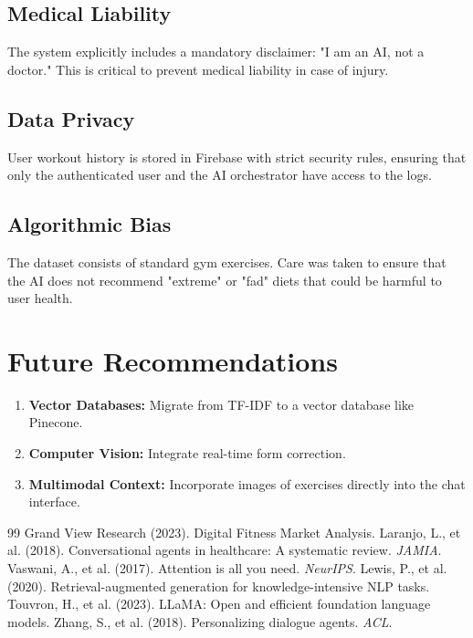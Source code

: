 \documentclass[12pt,a4paper]{report}
\begin{document}
\subsection{Medical Liability}
The system explicitly includes a mandatory disclaimer: "I am an AI, not a doctor." This is critical to prevent medical liability in case of injury.
\subsection{Data Privacy}
User workout history is stored in Firebase with strict security rules, ensuring that only the authenticated user and the AI orchestrator have access to the logs.
\subsection{Algorithmic Bias}
The dataset consists of standard gym exercises. Care was taken to ensure that the AI does not recommend "extreme" or "fad" diets that could be harmful to user health.

\section{Future Recommendations}
\begin{enumerate}
    \item \textbf{Vector Databases:} Migrate from TF-IDF to a vector database like Pinecone.
    \item \textbf{Computer Vision:} Integrate real-time form correction.
    \item \textbf{Multimodal Context:} Incorporate images of exercises directly into the chat interface.
\end{enumerate}

\begin{thebibliography}{99}
 Grand View Research (2023). Digital Fitness Market Analysis.
 Laranjo, L., et al. (2018). Conversational agents in healthcare: A systematic review. \textit{JAMIA}.
 Vaswani, A., et al. (2017). Attention is all you need. \textit{NeurIPS}.
 Lewis, P., et al. (2020). Retrieval-augmented generation for knowledge-intensive NLP tasks.
 Touvron, H., et al. (2023). LLaMA: Open and efficient foundation language models.
 Zhang, S., et al. (2018). Personalizing dialogue agents. \textit{ACL}.
\end{thebibliography}
\end{document}
